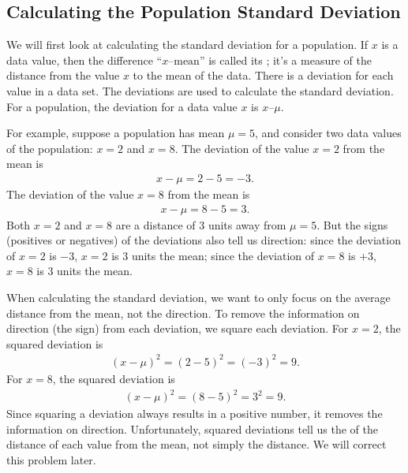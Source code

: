 \documentclass[letterpaper,10pt,english]{jupyterBook}
\begin{document}
\subsection{Calculating the Population Standard Deviation}
\label{\detokenize{Ch2 Descriptive Statistics/2.3 Measures of Dispersion:calculating-the-population-standard-deviation}}
\sphinxAtStartPar
We will first look at calculating the standard deviation for a population. If \(x\) is a data value, then the difference “\(x – \text{mean}\)” is called its ; it’s a measure of the distance from the value \(x\) to the mean of the data. There is a deviation for each value in a data set. The deviations are used to calculate the standard deviation. For a population, the deviation for a data value \(x\) is \(x – \mu\).

\sphinxAtStartPar
For example, suppose a population has mean \(\mu = 5\), and consider two data values of the population: \(x = 2\) and \(x = 8\). The deviation of the value \(x = 2\) from the mean is
\begin{equation*}
\begin{split}x - \mu = 2 - 5 = -3.\end{split}
\end{equation*}
\sphinxAtStartPar
The deviation of the value \(x = 8\) from the mean is
\begin{equation*}
\begin{split}x - \mu = 8 - 5 = 3.\end{split}
\end{equation*}
\sphinxAtStartPar
Both \(x = 2\) and \(x = 8\) are a distance of \(3\) units away from \(\mu = 5\). But the signs (positives or negatives) of the deviations also tell us direction: since the deviation of \(x = 2\) is \(-3\), \(x = 2\) is \(3\) units  the mean; since the deviation of \(x = 8\) is \(+3\), \(x = 8\) is \(3\) units  the mean.

\sphinxAtStartPar
When calculating the standard deviation, we want to only focus on the average distance from the mean, not the direction. To remove the information on direction (the sign) from each deviation, we square each deviation. For \(x = 2\), the squared deviation is
\begin{equation*}
\begin{split} (x - \mu)^2 = (2 - 5)^2 = (-3)^2 = 9. \end{split}
\end{equation*}
\sphinxAtStartPar
For \(x = 8\), the squared deviation is
\begin{equation*}
\begin{split} (x - \mu)^2 = (8 - 5)^2 = 3^2 = 9. \end{split}
\end{equation*}
\sphinxAtStartPar
Since squaring a deviation always results in a positive number, it removes the information on direction. Unfortunately, squared deviations tell us the  of the distance of each value from the mean, not simply the distance. We will correct this problem later.
\end{document}
